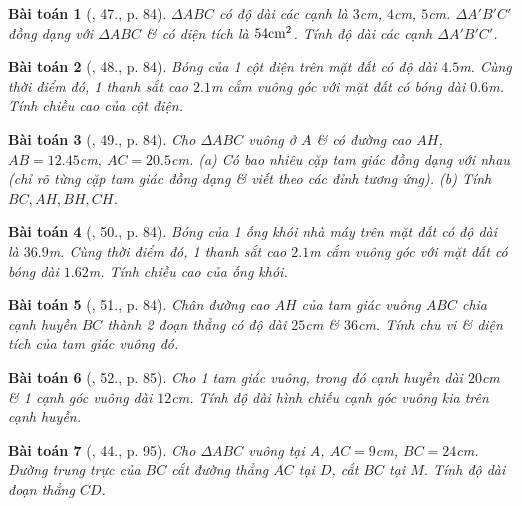 \documentclass{article}
\newtheorem{baitoan}{Bài toán}
\begin{document}
\begin{baitoan}[\cite{SGK_Toan_8_tap_2}, 47., p. 84]
	$\Delta ABC$ có độ dài các cạnh là $3$\emph{cm}, $4$\emph{cm}, $5$\emph{cm}. $\Delta A'B'C'$ đồng dạng với $\Delta ABC$ \& có diện tích là $54{\rm cm}^2$. Tính độ dài các cạnh $\Delta A'B'C'$.
\end{baitoan}

\begin{baitoan}[\cite{SGK_Toan_8_tap_2}, 48., p. 84]
	Bóng của 1 cột điện trên mặt đất có độ dài $4.5$\emph{m}. Cùng thời điểm đó, 1 thanh sắt cao $2.1$\emph{m} cắm vuông góc với mặt đất có bóng dài $0.6$\emph{m}. Tính chiều cao của cột điện.
\end{baitoan}

\begin{baitoan}[\cite{SGK_Toan_8_tap_2}, 49., p. 84]
	Cho $\Delta ABC$ vuông ở $A$ \& có đường cao $AH$, $AB = 12.45$\emph{cm}, $AC = 20.5$\emph{cm}. (a) Có bao nhiêu cặp tam giác đồng dạng với nhau (chỉ rõ từng cặp tam giác đồng dạng \& viết theo các đỉnh tương ứng). (b) Tính $BC,AH,BH,CH$.
\end{baitoan}

\begin{baitoan}[\cite{SGK_Toan_8_tap_2}, 50., p. 84]
	Bóng của 1 ống khói nhà máy trên mặt đất có độ dài là $36.9$\emph{m}. Cùng thời điểm đó, 1 thanh sắt cao $2.1$\emph{m} cắm vuông góc với mặt đất có bóng dài $1.62$\emph{m}. Tính chiều cao của ống khói.
\end{baitoan}

\begin{baitoan}[\cite{SGK_Toan_8_tap_2}, 51., p. 84]
	Chân đường cao $AH$ của tam giác vuông $ABC$ chia cạnh huyền $BC$ thành 2 đoạn thẳng có độ dài $25$\emph{cm} \& $36$\emph{cm}. Tính chu vi \& diện tích của tam giác vuông đó.
\end{baitoan}

\begin{baitoan}[\cite{SGK_Toan_8_tap_2}, 52., p. 85]
	Cho 1 tam giác vuông, trong đó cạnh huyền dài $20$\emph{cm} \& 1 cạnh góc vuông dài $12$\emph{cm}. Tính độ dài hình chiếu cạnh góc vuông kia trên cạnh huyền.
\end{baitoan}

\begin{baitoan}[\cite{SBT_Toan_8_tap_2}, 44., p. 95]
	Cho $\Delta ABC$ vuông tại $A$, $AC = 9$\emph{cm}, $BC = 24$\emph{cm}. Đường trung trực của $BC$ cắt đường thẳng $AC$ tại $D$, cắt $BC$ tại $M$. Tính độ dài đoạn thẳng $CD$.
\end{baitoan}
\end{document}
